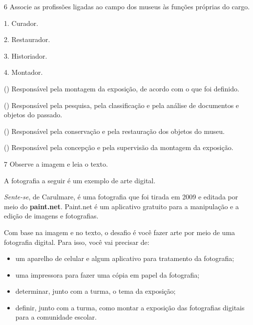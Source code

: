 
\num{6}  Associe as profissões ligadas ao campo dos museus às funções próprias do cargo.

\begin{multicols}{2}

1. Curador.

2. Restaurador.

3. Historiador.

4. Montador.

\columnbreak

() Responsável pela montagem da exposição, de acordo com o que foi definido.

() Responsável pela pesquisa, pela classificação e pela análise de documentos e objetos do passado.

() Responsável pela conservação e pela restauração dos objetos do museu.

() Responsável pela concepção e pela supervisão da montagem da exposição.
\end{multicols}



\num{7}  Observe a imagem e leia o texto.

A fotografia a seguir é um exemplo de arte digital.


\emph{Sente-se}, de Carulmare, é uma fotografia que foi tirada em 2009
e editada por meio do \textbf{paint.net}. Paint.net é um aplicativo gratuito para a manipulação e a edição de imagens e fotografias.

Com base na imagem e no texto, o desafio é você fazer arte por meio de uma
fotografia digital. Para isso, você vai precisar de:

\begin{itemize}
\item
  um aparelho de celular e algum aplicativo para tratamento da
  fotografia;
\item
  uma impressora para fazer uma cópia em papel da fotografia;
\item
  determinar, junto com a turma, o tema da exposição;
\item
  definir, junto com a turma, como montar a exposição das fotografias
  digitais para a comunidade escolar.
\end{itemize}


